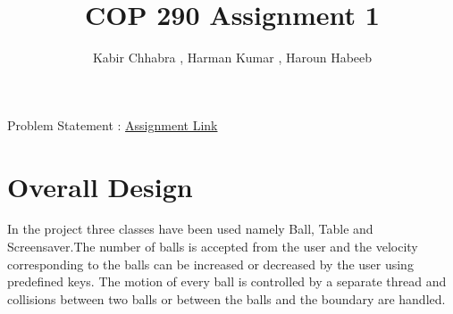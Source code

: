 \documentclass[]{article}
\begin{document}
\title{COP 290 Assignment 1}
\author{Kabir Chhabra , Harman Kumar , Haroun Habeeb}

\maketitle


\begin{center}
Problem Statement : \href { http://www.cse.iitd.ac.in/~prathmesh/ta/COP290/ass1.html }{Assignment Link}
\end{center}

\section{Overall Design}
\begin{flushleft}
In the project three classes have been used namely Ball, Table and Screensaver.The number of balls is accepted from the user and the velocity corresponding to the balls can be increased or decreased by the user using predefined keys. The motion of every ball is controlled by a separate thread and collisions between two balls or between the balls and the boundary are handled.
\end{flushleft} 
\end{document}
